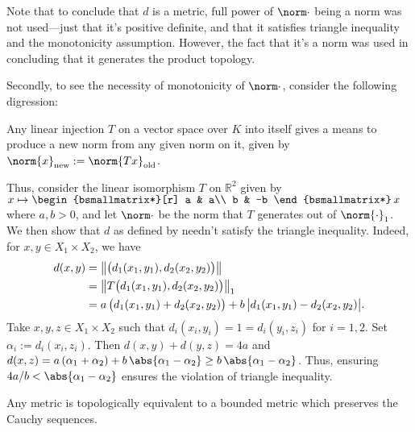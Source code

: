 	\begin{rmk}
		Note that to conclude that $d$ is a metric, full power of $\norm\cdot$ being a norm was not used---just that it's positive definite, and that it satisfies triangle inequality and the monotonicity assumption. However, the fact that it's a norm was used in concluding that it generates the product topology.
		
		Secondly, to see the necessity of monotonicity of $\norm\cdot$, consider the following digression:
		\begin{dgrs}
			Any linear injection $T$ on a vector space over $K$ into itself gives a means to produce a new norm from any given norm on it, given by $\norm{x}_\text{new} := \norm{Tx}_\text{old}$.
			
			Thus, consider the linear isomorphism $T$ on $\mathbb R^2$ given by $x\mapsto 
			\begin{bsmallmatrix*}[r]
				a & a\\
				b & -b
			\end{bsmallmatrix*}\, x$
			where $a, b > 0$, and let $\norm\cdot$ be the norm that $T$ generates out of $\norm{\cdot}_1$.
			We then show that $d$ as defined by  needn't satisfy the triangle inequality. Indeed, for $x, y\in X_1\times X_2$, we have
			\begin{align*}
				d(x, y) 
				& = \left\lVert \bigl( d_1(x_1, y_1), d_2(x_2, y_2) \bigr) \right\lVert\\
				& = \left\lVert T\bigl( d_1(x_1, y_1), d_2(x_2, y_2) \bigr) \right\lVert_1\\
				& = a\,\bigl(d_1(x_1, y_1) + d_2(x_2, y_2)\bigr)
				+ b\,\bigl| d_1(x_1, y_1) - d_2(x_2, y_2) \bigr|\text.
			\end{align*}
			Take $x, y, z\in X_1\times X_2$ such that $d_i(x_i, y_i) = 1 = d_i(y_i, z_i)$ for $i = 1, 2$. Set $\alpha_i := d_i(x_i, z_i)$. Then $d(x, y) + d(y, z) = 4a$ and $d(x, z) = a\,(\alpha_1 + \alpha_2) + b\,\abs{\alpha_1 - \alpha_2}\ge b\, \abs{\alpha_1 - \alpha_2}$. Thus, ensuring $4a/b < \abs{\alpha_1 - \alpha_2}$ ensures the violation of triangle inequality.
		\end{dgrs}
	\end{rmk}
	
	
	\begin{lem}\label{LEM: any metric is topologically equiv to a bdd metric}
		Any metric is topologically equivalent to a bounded metric which preserves the Cauchy sequences.
	\end{lem}
	
